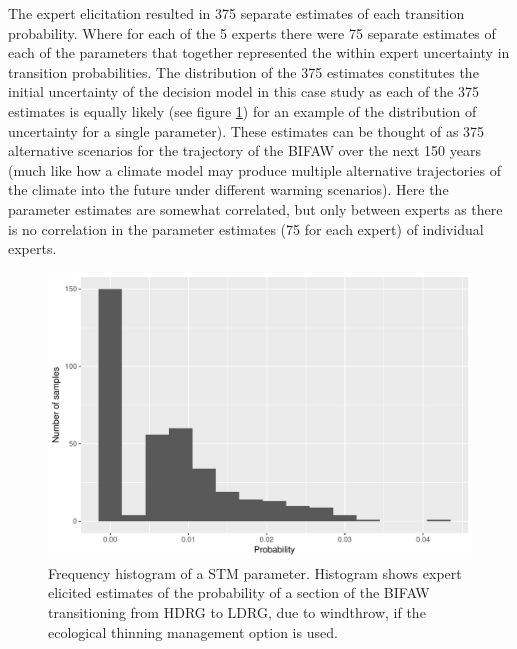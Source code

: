 \documentclass[draft]{article}
\theoremstyle{definition}
\theoremstyle{definition}
\theoremstyle{definition}
\theoremstyle{remark}
\begin{document}
The expert elicitation resulted in 375 separate estimates of each
transition probability. Where for each of the 5 experts there were 75
separate estimates of each of the parameters that together represented
the within expert uncertainty in transition probabilities. The
distribution of the 375 estimates constitutes the initial uncertainty of
the decision model in this case study as each of the 375 estimates is
equally likely (see figure \ref{fig:Figure2}) for an example of the
distribution of uncertainty for a single parameter). These estimates can
be thought of as 375 alternative scenarios for the trajectory of the
BIFAW over the next 150 years (much like how a climate model may produce
multiple alternative trajectories of the climate into the future under
different warming scenarios). Here the parameter estimates are somewhat
correlated, but only between experts as there is no correlation in the
parameter estimates (75 for each expert) of individual experts.






\begin{figure}[htbp]
\centering
\includegraphics{Figure2-1.pdf}
\caption{\label{fig:Figure2}Frequency histogram of a STM parameter. Histogram shows
expert elicited estimates of the probability of a section of the BIFAW
transitioning from HDRG to LDRG, due to windthrow, if the ecological
thinning management option is used.}
\end{figure}
\end{document}
